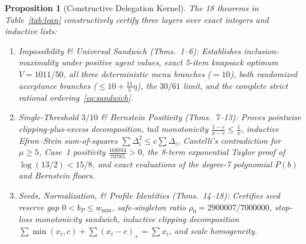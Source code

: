 \documentclass[10pt,twocolumn]{article}
\newtheorem{proposition}{Proposition}
\begin{document}
\begin{proposition}[Constructive Delegation Kernel]\label{prop:lean}
The 18 theorems in Table~\ref{tab:lean} constructively certify three layers over exact integers and inductive lists:
\begin{enumerate}[leftmargin=*,nosep]
  \item \emph{Impossibility \& Universal Sandwich (Thms.~1--6):} Establishes inclusion-maximality under positive agent values, exact 5-item knapsack optimum $V=1011/50$, all three deterministic menu branches ($=10$), both randomized acceptance branches ($\le 10 + \frac{11}{5}\eta$), the $30/61$ limit, and the complete strict rational ordering~\eqref{eq:sandwich}.
  \item \emph{Single-Threshold $3/10$ \& Bernstein Positivity (Thms.~7--13):} Proves pointwise clipping-plus-excess decomposition, tail monotonicity $\frac{1-e}{x-e}\le \frac{1}{x}$, inductive Efron--Stein sum-of-squares $\sum \Delta_i^2 \le c\sum \Delta_i$, Cantelli's contradiction for $\mu \ge 5$, Case~1 positivity $\frac{168034}{70785}>0$, the 8-term exponential Taylor proof of $\log(13/2) < 15/8$, and exact evaluations of the degree-7 polynomial $P(b)$ and Bernstein floors.
  \item \emph{Seeds, Normalization, \& Profile Identities (Thms.~14--18):} Certifies seed reserve gap $0 < b_P \le w_{\min}$, safe-singleton ratio $\rho_0 = 2900007/7000000$, stop-loss monotonicity sandwich, inductive clipping decomposition $\sum \min(x_i,c) + \sum (x_i-c)_+ = \sum x_i$, and scale homogeneity.
\end{enumerate}
\end{proposition}
\end{document}
